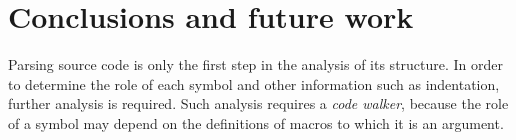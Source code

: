 \section{Conclusions and future work}

Parsing \commonlisp{} source code is only the first step in the
analysis of its structure.  In order to determine the role of each
symbol and other information such as indentation, further analysis is
required.  Such analysis requires a \emph{code walker}, because the
role of a symbol may depend on the definitions of macros to which it
is an argument.
